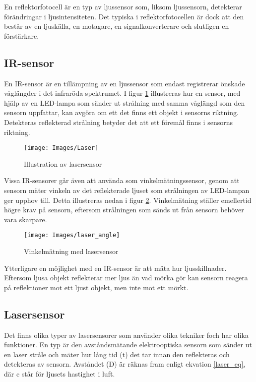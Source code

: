 \documentclass[11pt]{article}
\begin{document}
\begin{flushleft}
En reflektorfotocell är en typ av ljussensor som, liksom ljussensorn, detekterar förändringar i ljusintensiteten. Det typiska i reflektorfotocellen är dock att den  består av en ljuskälla, en motagare, en signalkonverterare och slutligen en förstärkare. \cite{website:automation}


\subsection{IR-sensor}
En IR-sensor är en tillämpning av en ljussensor som endast registrerar önskade våglängder i det infraröda spektrumet. I figur \ref{Laser} illustreras hur en sensor, med hjälp av en LED-lampa som sänder ut strålning med samma våglängd som den sensorn uppfattar, kan avgöra om ett det finns ett objekt i sensorns riktning. Detekteras reflekterad strålning betyder det att ett föremål finns i sensorns riktning.  \cite{website:cmu}

\begin{figure}[htbp]
	\centering
	\texttt{[image: Images/Laser]}
	\caption{Illustration av lasersensor \label{Laser}}
\end{figure}

\pagebreak
Vissa IR-sensorer går även att använda som vinkelmätningssensor, genom att sensorn mäter vinkeln av det reflekterade ljuset som strålningen av LED-lampan ger upphov till. Detta illustreras nedan i figur \ref{laser_angle}. Vinkelmätning ställer emellertid högre krav på sensorn, eftersom strålningen som sänds ut från sensorn behöver vara skarpare.

\begin{figure}[htbp]
	\centering
	\texttt{[image: Images/laser\_angle]}
	\caption{Vinkelmätning med lasersensor \label{laser_angle}}
\end{figure}

Ytterligare en möjlighet med en IR-sensor är att mäta hur ljusskillnader. Eftersom ljusa objekt reflekterar mer ljus än vad mörka gör kan sensorn reagera på reflektioner mot ett ljust objekt, men inte mot ett mörkt. \cite{website:cmu}

\subsection{Lasersensor}
Det finns olika typer av lasersensorer som använder olika tekniker foch har olika funktioner. En typ är den avståndsmätande elektrooptiska sensorn som sänder ut en laser stråle och mäter hur lång tid (t) det tar innan den reflekteras och detekteras av sensorn. Avståndet (D) är räknas fram enligt ekvation \ref{laser_eq}, där c står för ljusets hastighet i luft. \cite{website:mti}



\end{flushleft}
\end{document}

